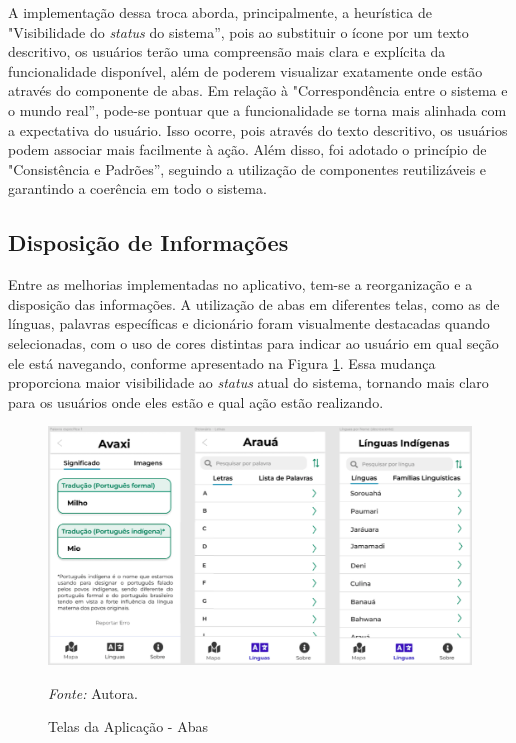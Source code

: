A implementação dessa troca aborda, principalmente, a heurística de "Visibilidade do \textit{status} do sistema'', pois ao substituir o ícone por um texto descritivo, os usuários terão uma compreensão mais clara e explícita da 
funcionalidade disponível, além de poderem visualizar exatamente onde estão através do componente de abas. Em relação à "Correspondência entre o sistema e o mundo real'', pode-se pontuar que a funcionalidade se torna mais 
alinhada com a expectativa do usuário. Isso ocorre, pois através do texto descritivo, os usuários podem associar mais facilmente à ação. Além disso, foi adotado o princípio de "Consistência e Padrões'', seguindo a utilização de componentes 
reutilizáveis e garantindo a coerência em todo o sistema. 

\subsection{Disposição de Informações}
\label{sec:Disposicao de Informacoes}

Entre as melhorias implementadas no aplicativo, tem-se a reorganização e a disposição das informações. A utilização de abas em diferentes telas, como as de línguas, palavras específicas e dicionário foram 
visualmente destacadas quando selecionadas, com o uso de cores distintas para indicar ao usuário em qual seção ele está navegando, conforme apresentado na Figura \ref{fig25}. Essa mudança proporciona maior visibilidade ao \textit{status} atual do sistema, tornando mais 
claro para os usuários onde eles estão e qual ação estão realizando.

\begin{figure}[h!]
	\centering
	\caption{Telas da Aplicação - Abas}
	\begin{adjustbox}{center}
		\includegraphics[width=1\textwidth]{figuras/abas.eps}
	\end{adjustbox}
	\begin{tablenotes}[flushleft]
		\centering
		\item \textit{Fonte:} Autora.
	\end{tablenotes}
	\label{fig25}
\end{figure}

